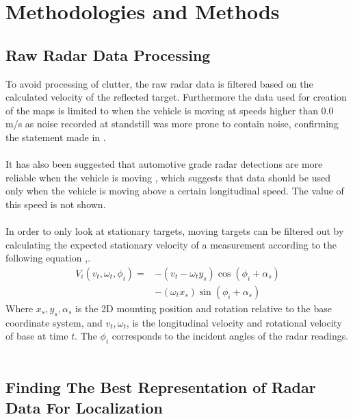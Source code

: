 \chapter{Methodologies and Methods}
\section{Raw Radar Data Processing}
To avoid processing of clutter, the raw radar data is filtered based on the calculated velocity of the reflected target. Furthermore the data used for creation of the maps is limited to when the vehicle is moving at speeds higher than 0.0 m/s as noise recorded at standstill was more prone to contain noise, confirming the statement made in \cite{narula_automotive-radar-based_2020}.
\\\\
It has also been suggested that automotive grade radar detections are more reliable when the vehicle is moving \cite{narula_automotive-radar-based_2020}, which suggests that data should be used only when the vehicle is moving above a certain longitudinal speed. The value of this speed is not shown. 
\\\\
In order to only look at stationary targets, moving targets can be filtered out by calculating the expected stationary velocity of a measurement according to the following equation \cite{ward_vehicle_2016},\cite{yoneda_vehicle_2018}.  
\begin{equation}
\begin{aligned}
V_{i}\left(v_t,\omega_{t}, \phi_{i}\right)=&-\left(v_{t}-\omega_{t} y_{s}\right) \cos \left(\phi_{i}+\alpha_{s}\right) \\
&-\left(\omega_{t} x_{s}\right) \sin \left(\phi_{i}+\alpha_{s}\right)
\end{aligned}
\end{equation}
Where $x_s,y_s,\alpha_s$ is the 2D mounting position and rotation relative to the base coordinate system, and $v_t,\omega_t$, is the longitudinal velocity and rotational velocity of base at time $t$. The $\phi_i$ corresponds to the incident angles of the radar readings.
\\\\

\section{Finding The Best Representation of Radar Data For Localization}





